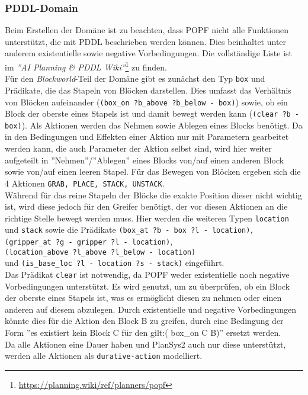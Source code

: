 \subsubsection{PDDL-Domain}
Beim Erstellen der Domäne ist zu beachten, dass \ac{POPF} nicht alle Funktionen unterstützt, die mit PDDL beschrieben werden können.
Dies beinhaltet unter anderem existentielle sowie negative Vorbedingungen.
Die vollständige Liste ist im \emph{''AI Planning \& PDDL Wiki''}\footnote{\url{https://planning.wiki/ref/planners/popf}} zu finden.\\
Für den \emph{Blockworld}-Teil der Domäne gibt es zunächst den Typ \verb|box| und Prädikate, die das Stapeln von Blöcken darstellen.
Dies umfasst das Verhältnis von Blöcken aufeinander (\verb|(box_on ?b_above ?b_below - box)|) sowie, ob ein Block der oberste eines Stapels ist und damit bewegt werden kann (\verb|(clear ?b - box)|).
Als Aktionen werden das Nehmen sowie Ablegen eines Blocks benötigt.
Da in den Bedingungen und Effekten einer Aktion nur mit Parametern gearbeitet werden kann, die auch Parameter der Aktion selbst sind, wird hier weiter aufgeteilt in ''Nehmen''/''Ablegen'' eines Blocks von/auf einen anderen Block sowie von/auf einen leeren Stapel.
Für das Bewegen von Blöcken ergeben sich die 4 Aktionen \verb|GRAB, PLACE, STACK, UNSTACK|.\\
Während für das reine Stapeln der Blöcke die exakte Position dieser nicht wichtig ist, wird diese jedoch für den Greifer benötigt, der vor diesen Aktionen an die richtige Stelle bewegt werden muss.
Hier werden die weiteren Typen \verb|location| und \verb|stack| sowie die Prädikate \verb|(box_at ?b - box ?l - location)|,\\ \verb|(gripper_at ?g - gripper ?l - location)|,\\ \verb|(location_above ?l_above ?l_below - location)|\\und \verb|(is_base_loc ?l - location ?s - stack)| eingeführt.\\
Das Prädikat \verb|clear| ist notwendig, da \ac{POPF} weder existentielle noch negative Vorbedingungen unterstützt.
Es wird genutzt, um zu überprüfen, ob ein Block der oberste eines Stapels ist, was es ermöglicht diesen zu nehmen oder einen anderen auf diesem abzulegen.
Durch existentielle und negative Vorbedingungen könnte dies für die Aktion den Block B zu greifen, durch eine Bedingung der Form ''es existiert kein Block C für den gilt:( box\_on C B)'' ersetzt werden.\\
Da alle Aktionen eine Dauer haben und \ac{PlanSys2} auch nur diese unterstützt, werden alle Aktionen als \verb|durative-action| modelliert.
